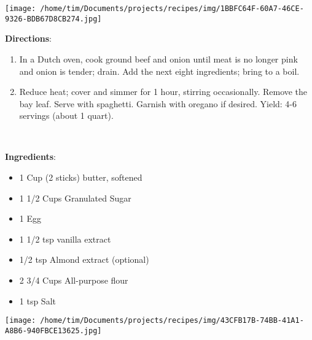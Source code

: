 \documentclass[11pt, twoside, openany]{book}
\begin{document}
\begin{minipage}[t]{0.2\linewidth}
\centering \strut\vspace*{-\baselineskip}\newline
\texttt{[image: /home/tim/Documents/projects/recipes/img/1BBFC64F-60A7-46CE-9326-BDB67D8CB274.jpg]}\\
\end{minipage}\vspace{3mm}
\textbf{Directions}:
\vspace{-3mm}\begin{enumerate}\setlength\itemsep{-1mm}
\item In a Dutch oven, cook ground beef and onion until meat is no longer pink and onion is tender; drain. Add the next eight ingredients; bring to a boil. 
\item  Reduce heat; cover and simmer for 1 hour, stirring occasionally. Remove the bay leaf. Serve with spaghetti. Garnish with oregano if desired. Yield: 4-6 servings (about 1 quart).
\end{enumerate}
 \label{sugar-cookies}\hfill\textit{}\\
\begin{minipage}[t]{0.8\linewidth}
\textbf{Ingredients}:\vspace{-3mm}
\begin{multicols}{2}
\begin{itemize}\setlength\itemsep{-1mm}
\item 1 Cup (2 sticks) butter, softened
\item 1 1/2 Cups Granulated Sugar
\item 1 Egg
\item 1 1/2 tsp vanilla extract
\item 1/2 tsp Almond extract (optional)
\item 2 3/4 Cups All-purpose flour
\item 1 tsp Salt
\end{itemize}
\end{multicols}
\end{minipage}
\begin{minipage}[t]{0.2\linewidth}
\centering \strut\vspace*{-\baselineskip}\newline
\texttt{[image: /home/tim/Documents/projects/recipes/img/43CFB17B-74BB-41A1-A8B6-940FBCE13625.jpg]}\\
\end{minipage}\vspace{3mm}
\end{document}
